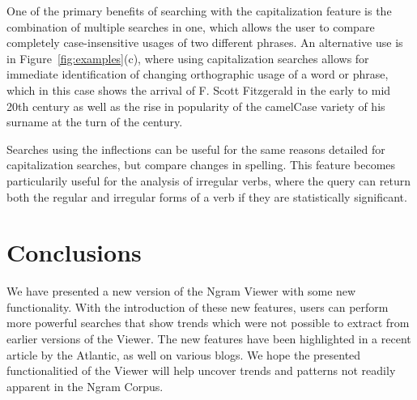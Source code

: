 \documentclass[11pt,a4paper]{article}
\newcommand{\jmcomment}[1]{\textcolor{magenta}{[$^{\textsc{J}}_{\textsc{M}}$ #1]}}
\newcommand{\eat}[1]{\ignorespaces}
\begin{document}
One of the primary benefits of searching with the capitalization feature is the combination of multiple searches in one, which allows the user to compare completely case-insensitive usages of two different phrases. An alternative use is in Figure~\ref{fig:examples}(c), where using capitalization searches allows for immediate identification of changing orthographic usage of a word or phrase, which in this case shows the arrival of F. Scott Fitzgerald in the early to mid 20th century as well as the rise in popularity of the camelCase variety of his surname at the turn of the century.

Searches using the inflections can be useful for the same reasons detailed for capitalization searches, but compare changes in spelling. This feature becomes particularily useful for the analysis of irregular verbs, where the query can return both the regular and irregular forms of a verb if they are statistically significant.


\section{Conclusions}
We have presented a new version of the Ngram Viewer with some new functionality. With the introduction of these new features, users can perform more powerful searches that show trends which were not possible to extract from earlier versions of the Viewer. The new features have been highlighted in a recent article by the Atlantic, as well on various blogs.
We hope the presented functionalitied of the Viewer will help uncover trends and patterns not readily apparent in the Ngram Corpus.

\eat{\jmcomment{Blog posts/entries from the internet:
http://sciencerefinery.com/2013/10/28/google-ngram-viewer-now-more-powerful-than-ever/
http://www.devingriffiths.com/google-books/google-n-gram-studies/
http://languagelog.ldc.upenn.edu/nll/?p=8472
http://www.textualscholarship.nl/?p=14051}}

\eat{\section{Acknowledgements}
We would like to thank John DeNero, ...}



\end{document}
